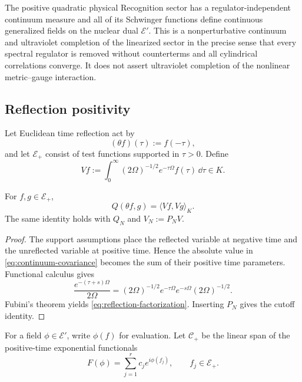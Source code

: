 \begin{corollary}
\label{cor:gaussian-uv}
The positive quadratic physical Recognition sector has a regulator-independent continuum measure and all of its Schwinger functions define continuous generalized fields on the nuclear dual $\mathscr E'$.  This is a nonperturbative continuum and ultraviolet completion of the linearized sector in the precise sense that every spectral regulator is removed without counterterms and all cylindrical correlations converge.  It does not assert ultraviolet completion of the nonlinear metric--gauge interaction.
\end{corollary}

\subsection{Reflection positivity}

Let Euclidean time reflection act by
\[
(\theta f)(\tau):=f(-\tau),
\]
and let $\mathscr E_+$ consist of test functions supported in $\tau>0$.  Define
\begin{equation}
Vf
:=\int_0^\infty
(2\Omega)^{-1/2}e^{-\tau\Omega}f(\tau)\,\dd\tau
\in K.
\label{eq:os-one-particle-map}
\end{equation}

\begin{lemma}
\label{lem:reflection-factorization}
For $f,g\in\mathscr E_+$,
\begin{equation}
Q(\theta f,g)=\langle Vf,Vg\rangle_K.
\label{eq:reflection-factorization}
\end{equation}
The same identity holds with $Q_N$ and $V_N:=P_NV$.
\end{lemma}

\begin{proof}
The support assumptions place the reflected variable at negative time and the unreflected variable at positive time.  Hence the absolute value in \eqref{eq:continuum-covariance} becomes the sum of their positive time parameters.  Functional calculus gives
\[
\frac{e^{-(\tau+s)\Omega}}{2\Omega}
=(2\Omega)^{-1/2}e^{-\tau\Omega}
 e^{-s\Omega}(2\Omega)^{-1/2}.
\]
Fubini's theorem yields \eqref{eq:reflection-factorization}.  Inserting $P_N$ gives the cutoff identity.
\end{proof}

For a field $\phi\in\mathscr E'$, write $\phi(f)$ for evaluation.  Let $\mathcal C_+$ be the linear span of the positive-time exponential functionals
\[
F(\phi)=\sum_{j=1}^r c_j e^{i\phi(f_j)},
\qquad f_j\in\mathscr E_+.
\]

